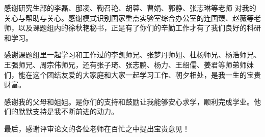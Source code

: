 感谢研究生部的李磊、邸凌、鞠召艳、胡蓉、曹娟、郭静、张志琳等老师
对我的关心与帮助与关心。感谢模式识别国家重点实验室综合办公室的连国臻、赵薇等老师，以及课题组内的徐秋艳秘书，正是有了你们的辛勤工作才有了我们良好的科研和学习。

感谢课题组里一起学习和工作过的李凯师兄、张梦丹师姐、杜杨师兄、杨浩师兄、王强师兄、周宗伟师兄，还有张子琦、张志鹏、杨力、王绍儒、姜君等师弟师妹们，能在这个团结友爱的大家庭和大家一起学习工作、朝夕相处，是我一生的宝贵财富。

感谢我的父母和姐姐。是你们的支持和鼓励让我能够安心求学，顺利完成学业。他们的默默支持是我不断前进的动力。

最后，感谢评审论文的各位老师在百忙之中提出宝贵意见！
\cleardoublepage[plain]%
